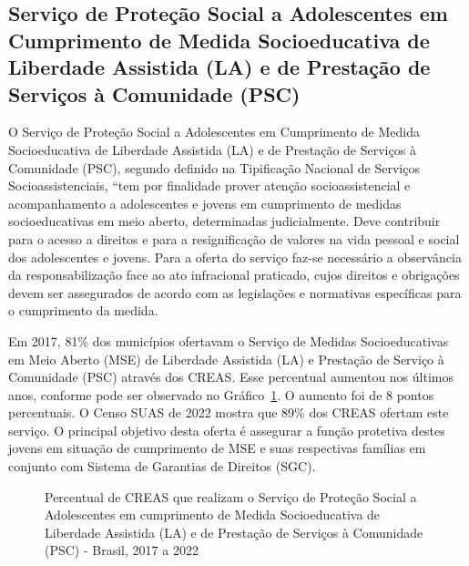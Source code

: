 \documentclass[
  letterpaper,
  DIV=11,
  numbers=noendperiod]{scrreprt}
\begin{document}
\subsection{Serviço de Proteção Social a Adolescentes em Cumprimento de
Medida Socioeducativa de Liberdade Assistida (LA) e de Prestação de
Serviços à Comunidade
(PSC)}\label{serviuxe7o-de-proteuxe7uxe3o-social-a-adolescentes-em-cumprimento-de-medida-socioeducativa-de-liberdade-assistida-la-e-de-prestauxe7uxe3o-de-serviuxe7os-uxe0-comunidade-psc}

O Serviço de Proteção Social a Adolescentes em Cumprimento de Medida
Socioeducativa de Liberdade Assistida (LA) e de Prestação de Serviços à
Comunidade (PSC), segundo definido na Tipificação Nacional de Serviços
Socioassistenciais, ``tem por finalidade prover atenção
socioassistencial e acompanhamento a adolescentes e jovens em
cumprimento de medidas socioeducativas em meio aberto, determinadas
judicialmente. Deve contribuir para o acesso a direitos e para a
resignificação de valores na vida pessoal e social dos adolescentes e
jovens. Para a oferta do serviço faz-se necessário a observância da
responsabilização face ao ato infracional praticado, cujos direitos e
obrigações devem ser assegurados de acordo com as legislações e
normativas específicas para o cumprimento da medida.

Em 2017, 81\% dos municípios ofertavam o Serviço de Medidas
Socioeducativas em Meio Aberto (MSE) de Liberdade Assistida (LA) e
Prestação de Serviço à Comunidade (PSC) através dos CREAS. Esse
percentual aumentou nos últimos anos, conforme pode ser observado no
Gráfico~\ref{fig-CREAS-MSE}. O aumento foi de 8 pontos percentuais. O
Censo SUAS de 2022 mostra que 89\% dos CREAS ofertam este serviço. O
principal objetivo desta oferta é assegurar a função protetiva destes
jovens em situação de cumprimento de MSE e suas respectivas famílias em
conjunto com Sistema de Garantias de Direitos (SGC).

\begin{figure}


\caption{\label{fig-CREAS-MSE}Percentual de CREAS que realizam o Serviço
de Proteção Social a Adolescentes em cumprimento de Medida
Socioeducativa de Liberdade Assistida (LA) e de Prestação de Serviços à
Comunidade (PSC) - Brasil, 2017 a 2022}

\end{figure}%
\end{document}
